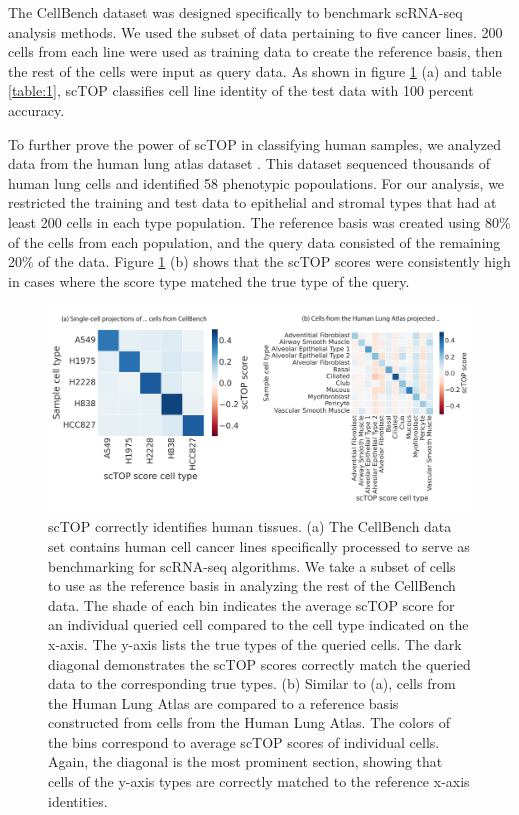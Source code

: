 \documentclass[aps,superscriptaddress, notitlepage,longbibliography]{revtex4-1}
\begin{document}
The CellBench dataset \cite{tian_benchmarking_2019} was designed specifically to benchmark scRNA-seq analysis methods. We used the subset of data pertaining to five cancer lines. 200 cells from each line were used as training data to create the reference basis, then the rest of the cells were input as query data. As shown in figure \ref{FIG:3} (a) and table \ref{table:1}, scTOP classifies cell line identity of the test data with 100 percent accuracy.

To further prove the power of scTOP in classifying human samples, we analyzed data from the human lung atlas dataset \cite{travaglini_molecular_2020}. This dataset sequenced thousands of human lung cells and identified 58 phenotypic popoulations. For our analysis, we restricted the training and test data to epithelial and stromal types that had at least 200 cells in each type population. The reference basis was created using 80\% of the cells from each population, and the query data consisted of the remaining 20\% of the data. Figure \ref{FIG:3} (b) shows that the scTOP scores were consistently high in cases where the score type matched the true type of the query.

\begin{figure}
	\centering
		\includegraphics[scale=0.8]{figs/fig3.pdf}
	\caption{scTOP correctly identifies human tissues. (a) The CellBench data set contains human cell cancer lines specifically processed to serve as benchmarking for scRNA-seq algorithms. We take a subset of cells to use as the reference basis in analyzing the rest of the CellBench data. The shade of each bin indicates the average scTOP score for an individual queried cell compared to the cell type indicated on the x-axis. The y-axis lists the true types of the queried cells. The dark diagonal demonstrates the scTOP scores correctly match the queried data to the corresponding true types. (b) Similar to (a), cells from the Human Lung Atlas are compared to a reference basis constructed from cells from the Human Lung Atlas. The colors of the bins correspond to average scTOP scores of individual cells. Again, the diagonal is the most prominent section, showing that cells of the y-axis types are correctly matched to the reference x-axis identities.}
	\label{FIG:3}
\end{figure}
\end{document}
